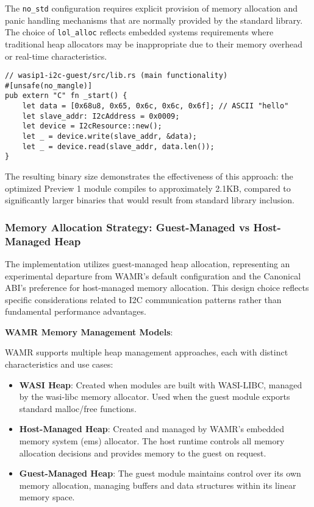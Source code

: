 The \texttt{no\_std} configuration requires explicit provision of memory allocation and panic handling mechanisms that are normally provided by the standard library. The choice of \texttt{lol\_alloc} reflects embedded systems requirements where traditional heap allocators may be inappropriate due to their memory overhead or real-time characteristics.

\begin{verbatim}
// wasip1-i2c-guest/src/lib.rs (main functionality)
#[unsafe(no_mangle)]
pub extern "C" fn _start() {
    let data = [0x68u8, 0x65, 0x6c, 0x6c, 0x6f]; // ASCII "hello"
    let slave_addr: I2cAddress = 0x0009;
    let device = I2cResource::new();
    let _ = device.write(slave_addr, &data);
    let _ = device.read(slave_addr, data.len());
}
\end{verbatim}

The resulting binary size demonstrates the effectiveness of this approach: the optimized Preview 1 module compiles to approximately 2.1KB, compared to significantly larger binaries that would result from standard library inclusion.

\subsubsection{Memory Allocation Strategy: Guest-Managed vs Host-Managed Heap}

The implementation utilizes guest-managed heap allocation, representing an experimental departure from WAMR's default configuration and the Canonical ABI's preference for host-managed memory allocation. This design choice reflects specific considerations related to I2C communication patterns rather than fundamental performance advantages.

\textbf{WAMR Memory Management Models}:

WAMR supports multiple heap management approaches, each with distinct characteristics and use cases:

\begin{itemize}
    \item \textbf{WASI Heap}: Created when modules are built with WASI-LIBC, managed by the wasi-libc memory allocator. Used when the guest module exports standard malloc/free functions.
    \item \textbf{Host-Managed Heap}: Created and managed by WAMR's embedded memory system (ems) allocator. The host runtime controls all memory allocation decisions and provides memory to the guest on request.
    \item \textbf{Guest-Managed Heap}: The guest module maintains control over its own memory allocation, managing buffers and data structures within its linear memory space.
\end{itemize}

